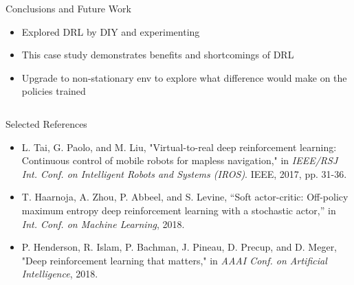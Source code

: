 \begin{frame}[fragile]
\begin{columns}[T]
\begin{column}{.46\textwidth}
\begin{block}{Conclusions and Future Work}
\begin{itemize}
\item Explored DRL by DIY and experimenting
\item This case study demonstrates benefits and shortcomings of DRL
\item Upgrade to non-stationary env to explore what difference would make on the policies trained
\end{itemize}
\end{block}

\end{column}

\end{columns}



\begin{block}{Selected References}
\begin{tiny}
\begin{itemize}
\item L. Tai, G. Paolo, and M. Liu, "Virtual-to-real deep reinforcement learning: Continuous control of mobile robots for mapless navigation," in \emph{IEEE/RSJ Int. Conf. on Intelligent Robots and Systems (IROS)}. IEEE, 2017, pp. 31-36.
\item T. Haarnoja, A. Zhou, P. Abbeel, and S. Levine, “Soft actor-critic: Off-policy maximum entropy deep reinforcement learning with a stochastic actor,” in \emph{Int. Conf. on Machine Learning}, 2018.
\item P. Henderson, R. Islam, P. Bachman, J. Pineau, D. Precup, and D. Meger, "Deep reinforcement learning that matters," in \emph{AAAI Conf. on Artificial Intelligence}, 2018.
\end{itemize}
\end{tiny}
\end{block}



\end{frame}
